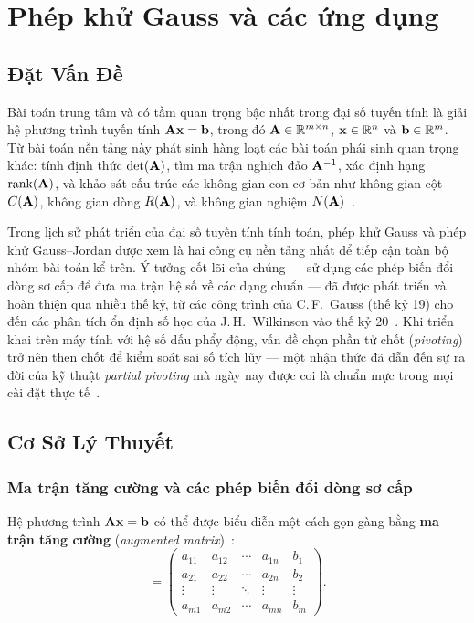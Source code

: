 \section{Phép khử Gauss và các ứng dụng}

\subsection{Đặt Vấn Đề}

Bài toán trung tâm và có tầm quan trọng bậc nhất trong đại số tuyến tính là giải hệ phương trình tuyến tính $\mathbf{A}\mathbf{x} = \mathbf{b}$, trong đó $\mathbf{A} \in \mathbb{R}^{m \times n}$, $\mathbf{x} \in \mathbb{R}^n$ và $\mathbf{b} \in \mathbb{R}^m$. Từ bài toán nền tảng này phát sinh hàng loạt các bài toán phái sinh quan trọng khác: tính định thức $\det(\mathbf{A})$, tìm ma trận nghịch đảo $\mathbf{A}^{-1}$, xác định hạng $\operatorname{rank}(\mathbf{A})$, và khảo sát cấu trúc các không gian con cơ bản như không gian cột $C(\mathbf{A})$, không gian dòng $R(\mathbf{A})$, và không gian nghiệm $N(\mathbf{A})$~\cite{strang2023}.

Trong lịch sử phát triển của đại số tuyến tính tính toán, phép khử Gauss và phép khử Gauss--Jordan được xem là hai công cụ nền tảng nhất để tiếp cận toàn bộ nhóm bài toán kể trên. Ý tưởng cốt lõi của chúng --- sử dụng các phép biến đổi dòng sơ cấp để đưa ma trận hệ số về các dạng chuẩn --- đã được phát triển và hoàn thiện qua nhiều thế kỷ, từ các công trình của C.\,F.~Gauss (thế kỷ 19) cho đến các phân tích ổn định số học của J.\,H.~Wilkinson vào thế kỷ 20~\cite{golub2013, higham2002}. Khi triển khai trên máy tính với hệ số dấu phẩy động, vấn đề chọn phần tử chốt (\textit{pivoting}) trở nên then chốt để kiểm soát sai số tích lũy --- một nhận thức đã dẫn đến sự ra đời của kỹ thuật \textit{partial pivoting} mà ngày nay được coi là chuẩn mực trong mọi cài đặt thực tế~\cite{higham2002}.

\subsection{Cơ Sở Lý Thuyết}

\subsubsection{Ma trận tăng cường và các phép biến đổi dòng sơ cấp}

Hệ phương trình $\mathbf{A}\mathbf{x} = \mathbf{b}$ có thể được biểu diễn một cách gọn gàng bằng \textbf{ma trận tăng cường} (\textit{augmented matrix})~\cite{strang2023}:
\begin{equation}
    [\mat{A} \mid \mat{b}] =
    \begin{pmatrix}
     a_{11} & a_{12} & \cdots & a_{1n} & b_1 \\
     a_{21} & a_{22} & \cdots & a_{2n} & b_2 \\
     \vdots & \vdots & \ddots & \vdots & \vdots \\
     a_{m1} & a_{m2} & \cdots & a_{mn} & b_m
    \end{pmatrix}.
\end{equation}

